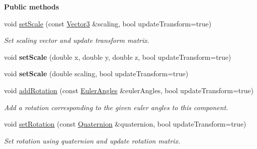 \begin{Indent}\textbf{ Public methods}\par
\begin{DoxyCompactItemize}
\item 
\mbox{\label{classrev_1_1_transform_a362fc254a193d5f7480df8da0596d5d0}} 
void \mbox{\hyperlink{classrev_1_1_transform_a362fc254a193d5f7480df8da0596d5d0}{set\+Scale}} (const \mbox{\hyperlink{classrev_1_1_vector}{Vector3}} \&scaling, bool update\+Transform=true)
\begin{DoxyCompactList}\small\item\em Set scaling vector and update transform matrix. \end{DoxyCompactList}\item 
\mbox{\label{classrev_1_1_transform_a41943382cb7c566808538d33df583174}} 
void {\bfseries set\+Scale} (double x, double y, double z, bool update\+Transform=true)
\item 
\mbox{\label{classrev_1_1_transform_aced9893387f11ddbaa805881ac59fd59}} 
void {\bfseries set\+Scale} (double scaling, bool update\+Transform=true)
\item 
\mbox{\label{classrev_1_1_transform_a22f5f5e3fa00c1b143f351fb9a535df9}} 
void \mbox{\hyperlink{classrev_1_1_transform_a22f5f5e3fa00c1b143f351fb9a535df9}{add\+Rotation}} (const \mbox{\hyperlink{classrev_1_1_euler_angles}{Euler\+Angles}} \&euler\+Angles, bool update\+Transform=true)
\begin{DoxyCompactList}\small\item\em Add a rotation corresponding to the given euler angles to this component. \end{DoxyCompactList}\item 
\mbox{\label{classrev_1_1_transform_ad4bbf4542422cc9d0cc1a521f48c913b}} 
void \mbox{\hyperlink{classrev_1_1_transform_ad4bbf4542422cc9d0cc1a521f48c913b}{set\+Rotation}} (const \mbox{\hyperlink{classrev_1_1_quaternion}{Quaternion}} \&quaternion, bool update\+Transform=true)
\begin{DoxyCompactList}\small\item\em Set rotation using quaternion and update rotation matrix. \end{DoxyCompactList}\item 

\end{DoxyCompactItemize}
\end{Indent}
